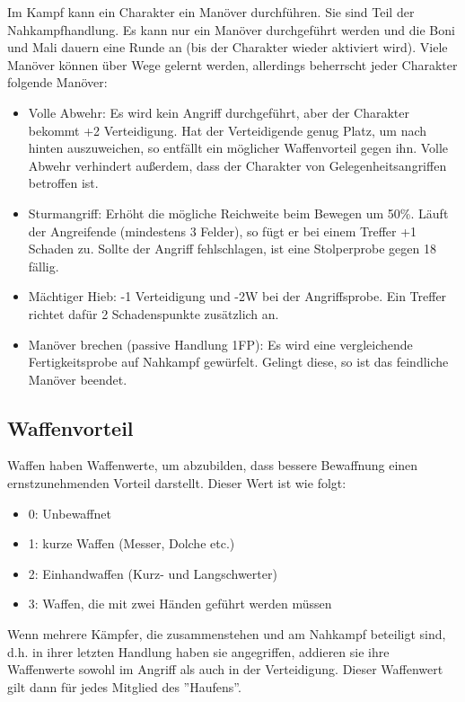 \documentclass{article}
\begin{document}
Im Kampf kann ein Charakter ein Manöver durchführen. Sie sind Teil der Nahkampfhandlung. Es kann nur ein Manöver
durchgeführt werden und die Boni und Mali dauern eine Runde an (bis der Charakter wieder aktiviert wird).
Viele Manöver können über Wege gelernt werden, allerdings beherrscht jeder Charakter folgende Manöver:

\begin{itemize}
\item Volle Abwehr: Es wird kein Angriff durchgeführt, aber der Charakter bekommt +2 Verteidigung. Hat der Verteidigende genug Platz, um nach hinten auszuweichen, so entfällt ein möglicher Waffenvorteil gegen ihn. Volle Abwehr verhindert außerdem, dass der Charakter von Gelegenheitsangriffen betroffen ist.
\item Sturmangriff: Erhöht die mögliche Reichweite beim Bewegen um 50\%. Läuft der Angreifende (mindestens 3 Felder), so fügt er bei einem Treffer +1 Schaden zu. Sollte der Angriff fehlschlagen, ist eine Stolperprobe gegen 18 fällig.
\item Mächtiger Hieb: -1 Verteidigung und -2W bei der Angriffsprobe. Ein Treffer richtet dafür 2 Schadenspunkte zusätzlich an.
\item Manöver brechen (passive Handlung 1FP): Es wird eine vergleichende Fertigkeitsprobe auf Nahkampf gewürfelt. Gelingt diese, so ist das feindliche Manöver beendet.
\end{itemize}

\begin{center}
\subsection{Waffenvorteil}
\end{center}

Waffen haben Waffenwerte, um abzubilden, dass bessere Bewaffnung einen ernstzunehmenden Vorteil darstellt. Dieser Wert
ist wie folgt:

\begin{itemize}
\item 0: Unbewaffnet
\item 1: kurze Waffen (Messer, Dolche etc.)
\item 2: Einhandwaffen (Kurz- und Langschwerter)
\item 3: Waffen, die mit zwei Händen geführt werden müssen
\end{itemize}

Wenn mehrere Kämpfer, die zusammenstehen und am Nahkampf beteiligt sind, d.h. in ihrer letzten Handlung haben sie
angegriffen, addieren sie ihre Waffenwerte sowohl im Angriff als auch in der Verteidigung. Dieser Waffenwert gilt dann
für jedes Mitglied des ''Haufens''.
\end{document}
